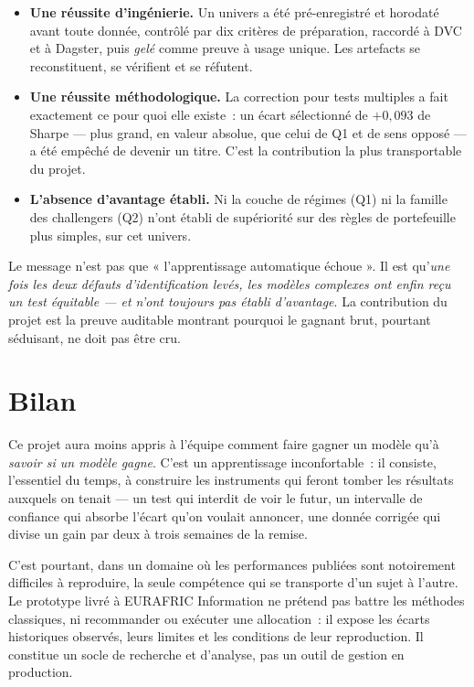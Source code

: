 \begin{itemize}
  \item \textbf{Une réussite d'ingénierie.} Un univers a été pré-enregistré et
        horodaté avant toute donnée, contrôlé par dix critères de préparation,
        raccordé à DVC et à Dagster, puis \emph{gelé} comme preuve à usage
        unique. Les artefacts se reconstituent, se vérifient et se réfutent.
  \item \textbf{Une réussite méthodologique.} La correction pour tests
        multiples a fait exactement ce pour quoi elle existe~: un écart
        sélectionné de $+0{,}093$ de Sharpe — plus grand, en valeur absolue,
        que celui de Q1 et de sens opposé — a été empêché de devenir un titre.
        C'est la contribution la plus transportable du projet.
  \item \textbf{L'absence d'avantage établi.} Ni la couche de régimes (Q1) ni
        la famille des challengers (Q2) n'ont établi de supériorité sur des
        règles de portefeuille plus simples, sur cet univers.
\end{itemize}

\begin{remarquebox}
Le message n'est pas que « l'apprentissage automatique échoue ». Il est
qu'\emph{une fois les deux défauts d'identification levés, les modèles complexes
ont enfin reçu un test équitable — et n'ont toujours pas établi d'avantage}. La
contribution du projet est la preuve auditable montrant pourquoi le gagnant brut,
pourtant séduisant, ne doit pas être cru.
\end{remarquebox}

\section*{Bilan}

Ce projet aura moins appris à l'équipe comment faire gagner un modèle qu'à
\emph{savoir si un modèle gagne}. C'est un apprentissage inconfortable~: il
consiste, l'essentiel du temps, à construire les instruments qui feront tomber
les résultats auxquels on tenait — un test qui interdit de voir le futur, un
intervalle de confiance qui absorbe l'écart qu'on voulait annoncer, une donnée
corrigée qui divise un gain par deux à trois semaines de la remise.

C'est pourtant, dans un domaine où les performances publiées sont notoirement
difficiles à reproduire, la seule compétence qui se transporte d'un sujet à
l'autre. Le prototype livré à EURAFRIC Information ne prétend pas battre les
méthodes classiques, ni recommander ou exécuter une allocation~: il expose les
écarts historiques observés, leurs limites et les conditions de leur
reproduction. Il constitue un socle de recherche et d'analyse, pas un outil de
gestion en production.
